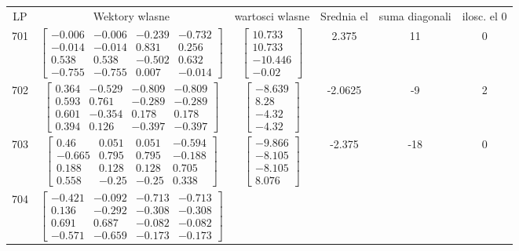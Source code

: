 \documentclass[a4paper,12pt]{article}
\begin{document}
\bgroup {} \vspace{0.2in} \begin{tabular}{c c c c c c}
LP &Wektory wlasne & wartosci wlasne & Srednia el & suma diagonali & ilosc. el 0\\
701
&
$\begin{bmatrix} -0.006 & -0.006 & -0.239 & -0.732 \\ -0.014 & -0.014 & 0.831 & 0.256 \\ 0.538 & 0.538 & -0.502 & 0.632 \\ -0.755 & -0.755 & 0.007 & -0.014 \end{bmatrix}$
&
$\begin{bmatrix} 10.733 \\ 10.733 \\ -10.446 \\ -0.02 \end{bmatrix}$
&
2.375
&
11
&
0
\\
702
&
$\begin{bmatrix} 0.364 & -0.529 & -0.809 & -0.809 \\ 0.593 & 0.761 & -0.289 & -0.289 \\ 0.601 & -0.354 & 0.178 & 0.178 \\ 0.394 & 0.126 & -0.397 & -0.397 \end{bmatrix}$
&
$\begin{bmatrix} -8.639 \\ 8.28 \\ -4.32 \\ -4.32 \end{bmatrix}$
&
-2.0625
&
-9
&
2
\\
703
&
$\begin{bmatrix} 0.46 & 0.051 & 0.051 & -0.594 \\ -0.665 & 0.795 & 0.795 & -0.188 \\ 0.188 & 0.128 & 0.128 & 0.705 \\ 0.558 & -0.25 & -0.25 & 0.338 \end{bmatrix}$
&
$\begin{bmatrix} -9.866 \\ -8.105 \\ -8.105 \\ 8.076 \end{bmatrix}$
&
-2.375
&
-18
&
0
\\
704
&
$\begin{bmatrix} -0.421 & -0.092 & -0.713 & -0.713 \\ 0.136 & -0.292 & -0.308 & -0.308 \\ 0.691 & 0.687 & -0.082 & -0.082 \\ -0.571 & -0.659 & -0.173 & -0.173 \end{bmatrix}$

\end{tabular}
\end{document}
